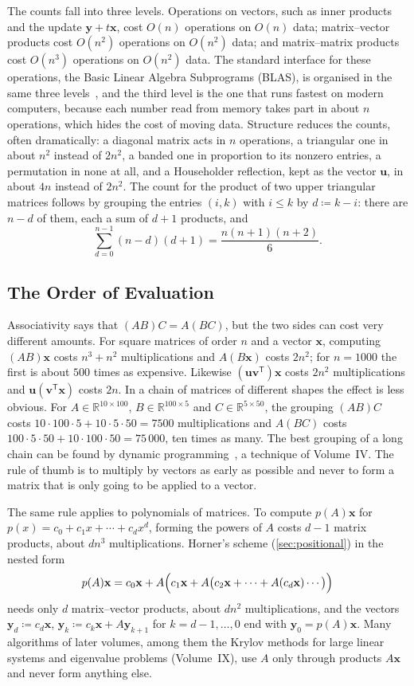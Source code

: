 The counts fall into three levels. Operations on vectors, such as inner products and the update $\mathbf y+t\mathbf x$, cost $O(n)$ operations on $O(n)$ data; matrix--vector products cost $O(n^2)$ operations on $O(n^2)$ data; and matrix--matrix products cost $O(n^3)$ operations on $O(n^2)$ data. The standard interface for these operations, the Basic Linear Algebra Subprograms (BLAS), is organised in the same three levels~\cite{dongarra1990}, and the third level is the one that runs fastest on modern computers, because each number read from memory takes part in about $n$ operations, which hides the cost of moving data. Structure reduces the counts, often dramatically: a diagonal matrix acts in $n$ operations, a triangular one in about $n^2$ instead of $2n^2$, a banded one in proportion to its nonzero entries, a permutation in none at all, and a Householder reflection, kept as the vector $\mathbf u$, in about $4n$ instead of $2n^2$. The count for the product of two upper triangular matrices follows by grouping the entries $(i,k)$ with $i\le k$ by $d\coloneqq k-i$: there are $n-d$ of them, each a sum of $d+1$ products, and
\[
\sum_{d=0}^{n-1}(n-d)(d+1)=\frac{n(n+1)(n+2)}6 .
\]

\subsection{The Order of Evaluation}

Associativity says that $(AB)C=A(BC)$, but the two sides can cost very different amounts. For square matrices of order $n$ and a vector $\mathbf x$, computing $(AB)\mathbf x$ costs $n^3+n^2$ multiplications and $A(B\mathbf x)$ costs $2n^2$; for $n=1000$ the first is about $500$ times as expensive. Likewise $(\mathbf u\mathbf v^{\mathsf T})\mathbf x$ costs $2n^2$ multiplications and $\mathbf u(\mathbf v^{\mathsf T}\mathbf x)$ costs $2n$. In a chain of matrices of different shapes the effect is less obvious. For $A\in\mathbb R^{10\times100}$, $B\in\mathbb R^{100\times5}$ and $C\in\mathbb R^{5\times50}$, the grouping $(AB)C$ costs $10\cdot100\cdot5+10\cdot5\cdot50=7500$ multiplications and $A(BC)$ costs $100\cdot5\cdot50+10\cdot100\cdot50=75\,000$, ten times as many. The best grouping of a long chain can be found by dynamic programming~\cite[Sect.~14.2]{cormen2022}, a technique of Volume~IV. The rule of thumb is to multiply by vectors as early as possible and never to form a matrix that is only going to be applied to a vector.

The same rule applies to polynomials of matrices. To compute $p(A)\mathbf x$ for $p(x)=c_0+c_1x+\cdots+c_dx^d$, forming the powers of $A$ costs $d-1$ matrix products, about $dn^3$ multiplications. Horner's scheme (\cref{sec:positional}) in the nested form
\[
p(A)\mathbf x=c_0\mathbf x+A\Bigl(c_1\mathbf x+A\bigl(c_2\mathbf x+\cdots+A(c_d\mathbf x)\cdots\bigr)\Bigr)
\]
needs only $d$ matrix--vector products, about $dn^2$ multiplications, and the vectors $\mathbf y_d\coloneqq c_d\mathbf x$, $\mathbf y_k\coloneqq c_k\mathbf x+A\mathbf y_{k+1}$ for $k=d-1,\ldots,0$ end with $\mathbf y_0=p(A)\mathbf x$. Many algorithms of later volumes, among them the Krylov methods for large linear systems and eigenvalue problems (Volume~IX), use $A$ only through products $A\mathbf x$ and never form anything else.

